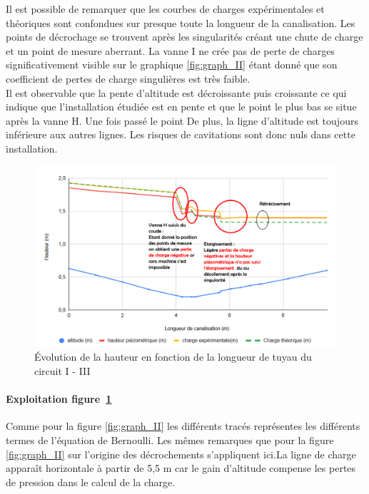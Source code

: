 \documentclass[12pt, a4paper, twoside]{article} %
\begin{document}
Il est possible de remarquer que les courbes de charges expérimentales et théoriques sont confondues sur presque toute la longueur de la canalisation. Les points de décrochage se trouvent après les singularités créant une chute de charge et un point de mesure aberrant. La vanne I ne crée pas de perte de charges significativement visible sur le graphique \ref{fig:graph_II} étant donné que son coefficient de pertes de charge singulières est très faible.\\
Il est observable que la pente d'altitude est décroissante puis croissante ce qui indique que l'installation étudiée est en pente et que le point le plus bas se situe après la vanne H. Une fois passé le point  De plus, la ligne d'altitude est toujours inférieure aux autres lignes. Les risques de cavitations sont donc nuls dans cette installation.

\begin{figure}[H]
    \centering
     \includegraphics[width = \linewidth]{graph_I_III.png}
    \caption{\'Evolution de la hauteur en fonction de la longueur de tuyau du circuit I - III}
    \label{fig:graph_III}
\end{figure} 

\paragraph{Exploitation figure~\ref{fig:graph_III}}

Comme pour la figure \ref{fig:graph_II} les différents tracés représentes les différents termes de l'équation de Bernoulli. Les mêmes remarques que pour la figure \ref{fig:graph_II} sur l'origine des décrochements s'appliquent ici.La ligne de charge apparaît horizontale à partir de 5,5 m car le gain d'altitude compense les pertes de pression dans le calcul de la charge. %
\end{document}
